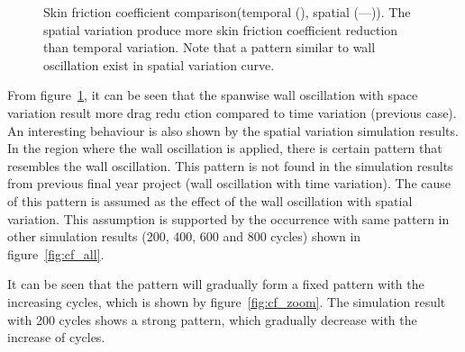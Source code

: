 \begin{figure}[!h]
  \centering
  \caption{Skin friction coefficient comparison(temporal (\Cutline), spatial (---)). The spatial variation produce more skin friction coefficient reduction than temporal variation. Note that a pattern similar to wall oscillation exist in spatial variation curve.}
  \label{fig:cf_compare}
\end{figure}

From figure~\ref{fig:cf_compare}, it can be seen that the spanwise wall oscillation with space variation result more drag redu ction compared to time variation (previous case). An interesting behaviour is also shown by the spatial variation simulation results. In the region where the wall oscillation is applied, there is certain pattern that resembles the wall oscillation. This pattern is not found in the simulation results from previous final year project (wall oscillation with time variation). The cause of this pattern is assumed as the effect of the wall oscillation with spatial variation. This assumption is supported by the occurrence with same pattern in other simulation results (200, 400, 600 and 800 cycles) shown in figure~\ref{fig:cf_all}. 

It can be seen that the pattern will gradually form a fixed pattern with the increasing cycles, which is shown by figure~\ref{fig:cf_zoom}. The simulation result with 200 cycles shows a strong pattern, which gradually decrease with the increase of cycles.

